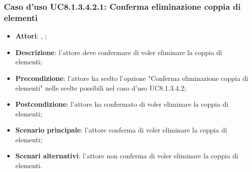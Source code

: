 		\subsubsection{Caso d'uso UC8.1.3.4.2.1: Conferma eliminazione coppia di elementi}
		\label{UC8.1.3.4.2.1}
		\begin{itemize}
			\item \textbf{Attori}: \uau, \uaupro;
			\item \textbf{Descrizione}: l'attore deve confermare di voler eliminare la coppia di elementi;
			\item \textbf{Precondizione}: l'attore ha scelto l'opzione "Conferma eliminazione coppia di elementi" nelle scelte possibili nel caso d'uso UC8.1.3.4.2;
			\item \textbf{Postcondizione}: l'attore ha confermato di voler eliminare la coppia di elementi;
			\item \textbf{Scenario principale}: l'attore conferma di voler eliminare la coppia di elementi;
			\item \textbf{Scenari alternativi}: l'attore non conferma di voler eliminare la coppia di elementi.
		\end{itemize}

